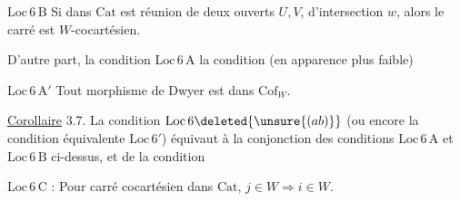 \uline{$\mathrm{Loc}\,6\,\mathrm B$} Si  dans $\mathrm{Cat}$ est réunion de deux ouverts $U,V$, d'intersection $w$, alors le carré
est $W$-cocartésien.

D'autre part, la condition $\mathrm{Loc}\,6\,\mathrm A$     la condition (en apparence plus faible)

\uline{$\mathrm{Loc}\,6\,\mathrm A'$} Tout morphisme de Dwyer est dans $\mathrm{Cof}_W$.

\uline{Corollaire} 3.7. La condition $\mathrm{Loc}\,6\deleted{\unsure{(ab)}}$  (ou encore la condition équivalente $\mathrm{Loc}\,6'$) équivaut à la conjonction des conditions $\mathrm{Loc}\,6\,\mathrm A$  et $\mathrm{Loc}\,6\,\mathrm B$ ci-dessus, et de la condition

\uline{$\mathrm{Loc}\,6\,\mathrm C$} : Pour  carré cocartésien
dans $\mathrm{Cat}$, $j\in W\Longrightarrow i\in W$.
